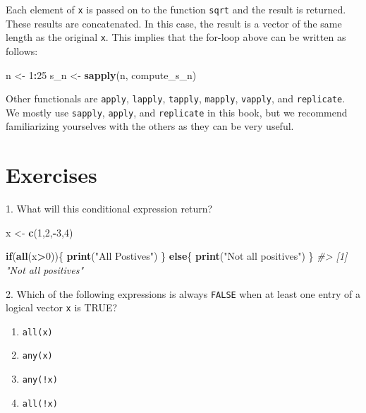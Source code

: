 \documentclass[
]{krantz}
\newenvironment{Shaded}{\begin{snugshade}}{\end{snugshade}}
\newcommand{\CommentTok}[1]{\textcolor[rgb]{0.37,0.37,0.37}{\textit{#1}}}
\newcommand{\ControlFlowTok}[1]{\textcolor[rgb]{0.27,0.27,0.27}{\textbf{#1}}}
\newcommand{\DecValTok}[1]{\textcolor[rgb]{0.06,0.06,0.06}{#1}}
\newcommand{\KeywordTok}[1]{\textcolor[rgb]{0.27,0.27,0.27}{\textbf{#1}}}
\newcommand{\NormalTok}[1]{#1}
\newcommand{\OperatorTok}[1]{\textcolor[rgb]{0.43,0.43,0.43}{\textbf{#1}}}
\newcommand{\StringTok}[1]{\textcolor[rgb]{0.5,0.5,0.5}{#1}}
\providecommand{\tightlist}{%
  \setlength{\itemsep}{0pt}\setlength{\parskip}{0pt}}
\begin{document}
Each element of \texttt{x} is passed on to the function \texttt{sqrt} and the result is returned. These results are concatenated. In this case, the result is a vector of the same length as the original \texttt{x}. This implies that the for-loop above can be written as follows:

\begin{Shaded}
\begin{Highlighting}[]
\NormalTok{n <-}\StringTok{ }\DecValTok{1}\OperatorTok{:}\DecValTok{25}
\NormalTok{s_n <-}\StringTok{ }\KeywordTok{sapply}\NormalTok{(n, compute_s_n)}
\end{Highlighting}
\end{Shaded}

Other functionals are \texttt{apply}, \texttt{lapply}, \texttt{tapply}, \texttt{mapply}, \texttt{vapply}, and \texttt{replicate}. We mostly use \texttt{sapply}, \texttt{apply}, and \texttt{replicate} in this book, but we recommend familiarizing yourselves with the others as they can be very useful.

\hypertarget{exercises-7}{%
\section{Exercises}\label{exercises-7}}

1. What will this conditional expression return?

\begin{Shaded}
\begin{Highlighting}[]
\NormalTok{x <-}\StringTok{ }\KeywordTok{c}\NormalTok{(}\DecValTok{1}\NormalTok{,}\DecValTok{2}\NormalTok{,}\OperatorTok{-}\DecValTok{3}\NormalTok{,}\DecValTok{4}\NormalTok{)}

\ControlFlowTok{if}\NormalTok{(}\KeywordTok{all}\NormalTok{(x}\OperatorTok{>}\DecValTok{0}\NormalTok{))\{}
  \KeywordTok{print}\NormalTok{(}\StringTok{"All Postives"}\NormalTok{)}
\NormalTok{\} }\ControlFlowTok{else}\NormalTok{\{}
  \KeywordTok{print}\NormalTok{(}\StringTok{"Not all positives"}\NormalTok{)}
\NormalTok{\}}
\CommentTok{#> [1] "Not all positives"}
\end{Highlighting}
\end{Shaded}

2. Which of the following expressions is always \texttt{FALSE} when at least one entry of a logical vector \texttt{x} is TRUE?

\begin{enumerate}
\def\labelenumi{\alph{enumi}.}
\tightlist
\item
  \texttt{all(x)}
\item
  \texttt{any(x)}
\item
  \texttt{any(!x)}
\item
  \texttt{all(!x)}
\end{enumerate}
\end{document}

